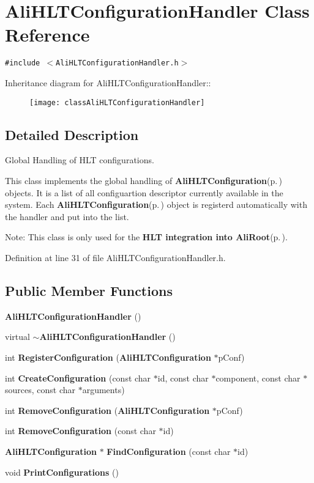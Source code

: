\section{Ali\-HLTConfiguration\-Handler Class Reference}
\label{classAliHLTConfigurationHandler}
{\tt \#include $<$Ali\-HLTConfiguration\-Handler.h$>$}

Inheritance diagram for Ali\-HLTConfiguration\-Handler::\begin{figure}[H]
\begin{center}
\leavevmode
\texttt{[image: classAliHLTConfigurationHandler]}
\end{center}
\end{figure}


\subsection{Detailed Description}
Global Handling of HLT configurations. 

This class implements the global handling of {\bf Ali\-HLTConfiguration}{\rm (p.\,\pageref{classAliHLTConfiguration})} objects. It is a list of all configuartion descriptor currently available in the system. Each {\bf Ali\-HLTConfiguration}{\rm (p.\,\pageref{classAliHLTConfiguration})} object is registerd automatically with the handler and put into the list.

\begin{Desc}
\item[Note:]This class is only used for the {\bf HLT integration into Ali\-Root}{\rm (p.\,\pageref{group__alihlt__system})}. \end{Desc}




Definition at line 31 of file Ali\-HLTConfiguration\-Handler.h.\subsection*{Public Member Functions}
\begin{CompactItemize}
\item 
{\bf Ali\-HLTConfiguration\-Handler} ()
\item 
virtual {\bf $\sim$Ali\-HLTConfiguration\-Handler} ()
\item 
int {\bf Register\-Configuration} ({\bf Ali\-HLTConfiguration} $\ast$p\-Conf)
\item 
int {\bf Create\-Configuration} (const char $\ast$id, const char $\ast$component, const char $\ast$sources, const char $\ast$arguments)
\item 
int {\bf Remove\-Configuration} ({\bf Ali\-HLTConfiguration} $\ast$p\-Conf)
\item 
int {\bf Remove\-Configuration} (const char $\ast$id)
\item 
{\bf Ali\-HLTConfiguration} $\ast$ {\bf Find\-Configuration} (const char $\ast$id)
\item 
void {\bf Print\-Configurations} ()
\end{CompactItemize}

